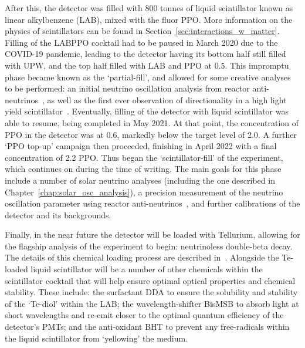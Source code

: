 After this, the detector was filled with 800 tonnes of liquid scintillator known as linear alkylbenzene (LAB), mixed with the fluor PPO. More information on the physics of scintillators can be found in Section~\ref{sec:interactions_w_matter}. Filling of the LABPPO cocktail had to be paused in March 2020 due to the COVID-19 pandemic, leading to the detector having its bottom half still filled with UPW, and the top half filled with LAB and PPO at \SI{0.5}{\gpl}. This impromptu phase became known as the `partial-fill', and allowed for some creative analyses to be performed: an initial neutrino oscillation analysis from reactor anti-neutrinos~\cite{}, %
as well as the first ever observation of directionality in a high light yield scintillator~\cite{}. %
Eventually, filling of the detector with liquid scintillator was able to resume, being completed in May 2021. At that point, the concentration of PPO in the detector was at \SI{0.6}{\gpl}, markedly below the target level of \SI{2.0}{\gpl}. A further `PPO top-up' campaign then proceeded, finishing in April 2022 with a final concentration of \SI{2.2}{\gpl} PPO. Thus began the `scintillator-fill' of the experiment, which continues on during the time of writing. The main goals for this phase include a number of solar neutrino analyses (including the one described in Chapter~\ref{chap:solar_osc_analysis}), a precision measurement of the neutrino oscillation parameter \dmsq{} using reactor anti-neutrinos~\cite{}, %
and further calibrations of the detector and its backgrounds.

Finally, in the near future the detector will be loaded with Tellurium, allowing for the flagship analysis of the experiment to begin: neutrinoless double-beta decay. The details of this chemical loading process are described in~\cite{}. %
Alongside the Te-loaded liquid scintillator will be a number of other chemicals within the scintillator cocktail that will help ensure optimal optical properties and chemical stability. These include: the surfactant DDA to ensure the solubility and stability of the `Te-diol' within the LAB; the wavelength-shifter BisMSB to absorb light at short wavelengths and re-emit closer to the optimal quantum efficiency of the detector's PMTs; and the anti-oxidant BHT to prevent any free-radicals within the liquid scintillator from `yellowing' the medium.

